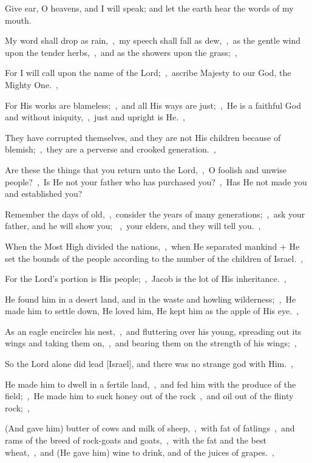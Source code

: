 \documentclass[12pt,twoside,a5paper]{article}
\begin{document}
\begin{halfparskip}
   Give ear, O heavens, and I will speak; and let the earth hear the words of my mouth.


  My word shall drop as rain,~\sep\ my speech shall fall as dew,~\sep\ as the gentle wind upon the tender herbs,~\sep\ and as the showers upon the grass;~\sep

  For I will call upon the name of the Lord;~\sep\ ascribe Majesty to our God, the Mighty One.~\sep

  For His works are blameless;~\sep\ and all His ways are just;~\sep\ He is a faithful God and without iniquity,~\sep\ just and upright is He.~\sep

  They have corrupted themselves, and they are not His children because of blemish;~\sep\ they are a perverse and crooked generation.~\sep

  Are these the things that you return unto the Lord,~\sep\ O foolish and unwise people?~\sep\ Is He not your father who has purchased you?~\sep\ Has He not made you and established you?

  Remember the days of old,~\sep\ consider the years of many generations;~\sep\ ask your father, and he will show you; ~\sep\ your elders, and they will tell you.~\sep

  When the Most High divided the nations,~\sep\ when He separated mankind + He set the bounds of the people according to the number of the children of Israel.~\sep

  For the Lord's portion is His people;~\sep\ Jacob is the lot of His inheritance.~\sep

  He found him in a desert land, and in the waste and howling wilderness;~\sep\ He made him to settle down, He loved him, He kept him as the apple of His eye.~\sep

  As an eagle encircles his nest,~\sep\ and fluttering over his young, spreading out its wings and taking them on,~\sep\ and bearing them on the strength of his wings;~\sep

  So the Lord alone did lead [Israel], and there was no strange god with Him.~\sep

  He made him to dwell in a fertile land,~\sep\ and fed him with the produce of the field;~\sep\ He made him to suck honey out of the rock~\sep\ and oil out of the flinty rock;~\sep

  (And gave him) butter of cows and milk of sheep,~\sep\ with fat of fatlings~\sep\ and rams of the breed of rock-goats and goats,~\sep\ with the fat and the best wheat,~\sep\ and (He gave him) wine to drink, and of the juices of grapes.~\sep


\end{halfparskip}
\end{document}
